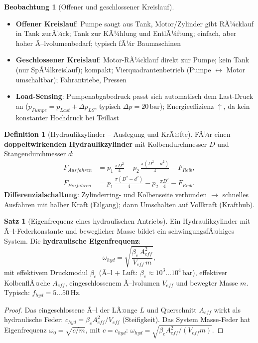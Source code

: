 ﻿\documentclass[a4paper,12pt]{report}
\theoremstyle{definition}
\newtheorem{definition}{Definition}
\newtheorem{satz}{Satz}
\newtheorem{beobachtung}{Beobachtung}
\begin{document}
\begin{beobachtung}[Offener und geschlossener Kreislauf]
\begin{itemize}
    \item[-] \textbf{Offener Kreislauf}: Pumpe saugt aus Tank, Motor/Zylinder
          gibt RÃ¼cklauf in Tank zurÃ¼ck; Tank zur KÃ¼hlung und EntlÃ¼ftung;
          einfach, aber hoher Ã–lvolumenbedarf; typisch fÃ¼r Baumaschinen
    \item[-] \textbf{Geschlossener Kreislauf}: Motor-RÃ¼cklauf direkt zur Pumpe;
          kein Tank (nur SpÃ¼lkreislauf); kompakt; Vierquadrantenbetrieb
          (Pumpe $\leftrightarrow$ Motor umschaltbar); Fahrantriebe, Pressen
    \item[-] \textbf{Load-Sensing}: Pumpenabgabedruck passt sich automatisch
          dem Last-Druck an ($p_{Pumpe} = p_{Last} + \Delta p_{LS}$, typisch $\Delta p = 20\,\mathrm{bar}$);
          Energieeffizienz $\uparrow$, da kein konstanter Hochdruck bei Teillast
\end{itemize}
\end{beobachtung}

\begin{definition}[Hydraulikzylinder -- Auslegung und KrÃ¤fte]
FÃ¼r einen \textbf{doppeltwirkenden Hydraulikzylinder} mit Kolbendurchmesser $D$
und Stangendurchmesser $d$:
\begin{align*}
  F_{Ausfahren} &= p_1\,\frac{\pi D^2}{4} - p_2\,\frac{\pi(D^2-d^2)}{4} - F_{Reib}, \\
  F_{Einfahren} &= p_1\,\frac{\pi(D^2-d^2)}{4} - p_2\,\frac{\pi D^2}{4} - F_{Reib}.
\end{align*}
\textbf{Differenzialschaltung}: Zylinderring- und Kolbenseite verbunden $\to$
schnelles Ausfahren mit halber Kraft (Eilgang); dann Umschalten auf
Vollkraft (Krafthub).
\end{definition}

\begin{satz}[Eigenfrequenz eines hydraulischen Antriebs]
Ein Hydraulikzylinder mit Ã–l-Federkonstante und beweglicher Masse
bildet ein schwingungsfÃ¤higes System. Die \textbf{hydraulische Eigenfrequenz}:
\[
  \omega_{hyd} = \sqrt{\frac{\beta_e\,A_{eff}^2}{V_{eff}\,m}},
\]
mit effektivem Druckmodul $\beta_e$ (Ã–l + Luft: $\beta_e \approx 10^3\ldots10^4\,\mathrm{bar}$),
effektiver KolbenflÃ¤che $A_{eff}$, eingeschlossenem Ã–lvolumen $V_{eff}$
und bewegter Masse $m$. Typisch: $f_{hyd} = 5\ldots50\,\mathrm{Hz}$.
\end{satz}
\begin{proof}
Das eingeschlossene Ã–l der LÃ¤nge $L$ und Querschnitt $A_{eff}$ wirkt
als hydraulische Feder: $c_{hyd} = \beta_e A_{eff}^2 / V_{eff}$ (Steifigkeit).
Das System Masse-Feder hat Eigenfrequenz $\omega_0 = \sqrt{c/m}$,
mit $c = c_{hyd}$: $\omega_{hyd} = \sqrt{\beta_e A_{eff}^2/(V_{eff}m)}$.
\end{proof}
\end{document}
